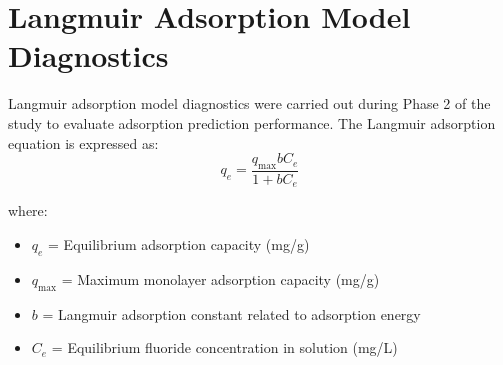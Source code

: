 %
%	
%
%
%
%

\section{Langmuir Adsorption Model Diagnostics}

%

Langmuir adsorption model diagnostics were carried out during Phase 2 of the study to evaluate adsorption prediction performance. The Langmuir adsorption equation is expressed as: 
\begin{equation}
	q_e = \frac{q_{\max} b C_e}{1 + b C_e}
\end{equation}

where:

\begin{itemize}
	\item $q_e$ = Equilibrium adsorption capacity (mg/g)
	\item $q_{\max}$ = Maximum monolayer adsorption capacity (mg/g)
	\item $b$ = Langmuir adsorption constant related to adsorption energy
	\item $C_e$ = Equilibrium fluoride concentration in solution (mg/L)
\end{itemize}

